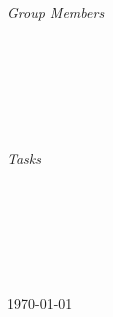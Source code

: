 \begin{titlepage}
\begin{minipage}{0.4\textwidth}
\begin{flushleft} \large
\emph{Group Members}\\
\@author\\[1.2em] %
\\[1.2em]
\\[1.2em]
\\
\end{flushleft}
\end{minipage}
~
\begin{minipage}{0.4\textwidth}
\begin{flushright} \large
\emph{Tasks} \\
 \\[1.2em] 
 \\[1.2em] 
 \\[1.2em] 
\\[1.2em] 
\end{flushright}
\end{minipage}\\[2cm]
\makeatother


{\large \today}\\[2cm] %

\vfill %

\end{titlepage}